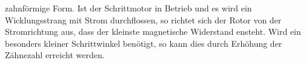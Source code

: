 zahnförmige Form. Ist der Schrittmotor in Betrieb und es wird ein Wicklungsstrang mit Strom durchflossen, so richtet sich der Rotor von der Stromrichtung aus, dass der kleinste magnetische Widerstand ensteht. Wird ein besonders kleiner Schrittwinkel benötigt, so kann dies durch Erhöhung der Zähnezahl erreicht werden. \cite{Schroder.2013} \cite{Hagl.2021}